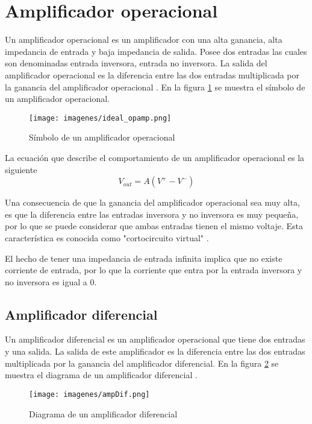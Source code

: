 \section{Amplificador operacional}

Un amplificador operacional es un amplificador con una alta ganancia,
alta impedancia de entrada y baja impedancia de salida. Posee dos entradas
las cuales son denominadas entrada inversora, entrada no inversora. La salida
del amplificador operacional es la diferencia entre las dos entradas multiplicada
por la ganancia del amplificador operacional \cite{electronic_Boylestad}. En 
la figura \ref{fig:ampOp} se muestra el símbolo de un amplificador operacional.

\begin{figure}[H]
    \centering
    \texttt{[image: imagenes/ideal\_opamp.png]}
    \caption{Símbolo de un amplificador operacional \cite{electronic_Boylestad}}
    \label{fig:ampOp}
\end{figure}

La ecuación que describe el comportamiento de un amplificador operacional es la siguiente
\begin{equation}
    V_{out} = A(V^+ - V^-)
    \label{eq:ampOp}
\end{equation}

Una consecuencia de que la ganancia del amplificador operacional sea muy alta, es que
la diferencia entre las entradas inversora y no inversora es muy pequeña, por lo que
se puede considerar que ambas entradas tienen el mismo voltaje. Esta característica
es conocida como "cortocircuito virtual" \cite{electronic_Boylestad}.

 El hecho de tener una 
impedancia de entrada infinita implica que no existe corriente de entrada, por lo que
la corriente que entra por la entrada inversora y no inversora es igual a 0. 

\subsection{Amplificador diferencial}
\label{sec:ampDif}
Un amplificador diferencial es un amplificador operacional que tiene dos entradas
y una salida. La salida de este amplificador es la diferencia entre las dos entradas
multiplicada por la ganancia del amplificador diferencial. En la figura \ref{fig:ampDif}
se muestra el diagrama de un amplificador diferencial \cite{electronic_Boylestad}.

\begin{figure}[H]
    \centering
    \texttt{[image: imagenes/ampDif.png]}
    \caption{Diagrama de un amplificador diferencial \cite{electronic_Boylestad}}
    \label{fig:ampDif}
\end{figure}

